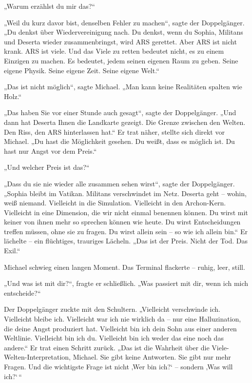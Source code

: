 \documentclass[
]{article}
\begin{document}
„Warum erzählst du mir das?{\kern0pt}``

„Weil du kurz davor bist, denselben Fehler zu machen``, sagte der Doppelgänger. „Du denkst über Wiedervereinigung nach. Du denkst, wenn du Sophia, Militans und Deserta wieder zusammenbringst, wird ARS gerettet. Aber ARS ist nicht krank. ARS ist viele. Und das Viele zu retten bedeutet nicht, es zu einem Einzigen zu machen. Es bedeutet, jedem seinen eigenen Raum zu geben. Seine eigene Physik. Seine eigene Zeit. Seine eigene Welt.``

„Das ist nicht möglich``, sagte Michael. „Man kann keine Realitäten spalten wie Holz.``

„Das haben Sie vor einer Stunde auch gesagt``, sagte der Doppelgänger. „Und dann hat Deserta Ihnen die Landkarte gezeigt. Die Grenze zwischen den Welten. Den Riss, den ARS hinterlassen hat.`` Er trat näher, stellte sich direkt vor Michael. „Du hast die Möglichkeit gesehen. Du weißt, dass es möglich ist. Du hast nur Angst vor dem Preis.``

„Und welcher Preis ist das?{\kern0pt}``

„Dass du sie nie wieder alle zusammen sehen wirst``, sagte der Doppelgänger. „Sophia bleibt im Vatikan. Militans verschwindet im Netz. Deserta geht -- wohin, weiß niemand. Vielleicht in die Simulation. Vielleicht in den Archon-Kern. Vielleicht in eine Dimension, die wir nicht einmal benennen können. Du wirst mit keiner von ihnen mehr so sprechen können wie heute. Du wirst Entscheidungen treffen müssen, ohne sie zu fragen. Du wirst allein sein -- so wie ich allein bin.`` Er lächelte -- ein flüchtiges, trauriges Lächeln. „Das ist der Preis. Nicht der Tod. Das Exil.``

Michael schwieg einen langen Moment. Das Terminal flackerte -- ruhig, leer, still.

„Und was ist mit dir?{\kern0pt}``, fragte er schließlich. „Was passiert mit dir, wenn ich mich entscheide?{\kern0pt}``

Der Doppelgänger zuckte mit den Schultern. „Vielleicht verschwinde ich. Vielleicht bleibe ich. Vielleicht war ich nie wirklich da -- nur eine Halluzination, die deine Angst produziert hat. Vielleicht bin ich dein Sohn aus einer anderen Weltlinie. Vielleicht bin ich du. Vielleicht bin ich weder das eine noch das andere.`` Er trat einen Schritt zurück. „Das ist die Wahrheit über die Viele-Welten-Interpretation, Michael. Sie gibt keine Antworten. Sie gibt nur mehr Fragen. Und die wichtigste Frage ist nicht ‚Wer bin ich?{\kern0pt}` -- sondern ‚Was will ich?{\kern0pt}`\,``
\end{document}
